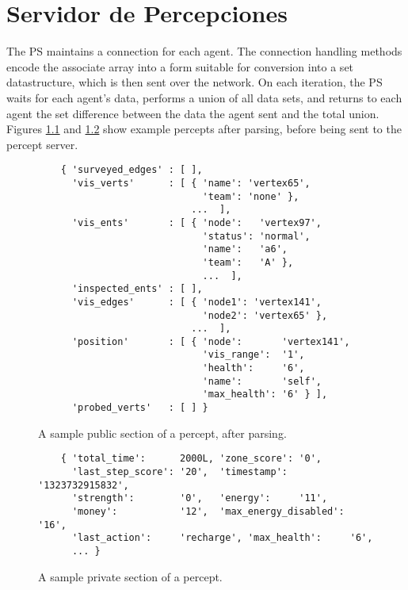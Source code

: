 
\chapter{Servidor de Percepciones}
\label{chap:servidor_de_percepciones}

    The PS maintains a connection for each agent.  The connection handling
    methods encode the associate array into a form suitable for conversion into
    a set datastructure, which is then sent over the network.  On each
    iteration, the PS waits for each agent's data, performs a union of all data
    sets, and returns to each agent the set difference between the data the
    agent sent and the total union.  Figures \ref{fig:pythonperceptpublic} and
    \ref{fig:pythonperceptprivate} show example percepts after parsing, before
    being sent to the percept server.

    \begin{figure}
    \centering
    
    \begin{small}
    \begin{verbatim}
    { 'surveyed_edges' : [ ], 
      'vis_verts'      : [ { 'name': 'vertex65',  
                             'team': 'none' }, 
                           ...  ],  
      'vis_ents'       : [ { 'node':   'vertex97',  
                             'status': 'normal', 
                             'name':   'a6',  
                             'team':   'A' }, 
                             ...  ],  
      'inspected_ents' : [ ],  
      'vis_edges'      : [ { 'node1': 'vertex141', 
                             'node2': 'vertex65' }, 
                           ...  ], 
      'position'       : [ { 'node':       'vertex141', 
                             'vis_range':  '1', 
                             'health':     '6', 
                             'name':       'self', 
                             'max_health': '6' } ], 
      'probed_verts'   : [ ] }
    \end{verbatim}
    \end{small}
    \caption{A sample public section of a percept, after parsing.}
    \label{fig:pythonperceptpublic}
    \end{figure}

    \begin{figure}
   


    \begin{verbatim}
    { 'total_time':      2000L, 'zone_score': '0',            
      'last_step_score': '20',  'timestamp':  '1323732915832',       
      'strength':        '0',   'energy':     '11',                  
      'money':           '12',  'max_energy_disabled': '16',                  
      'last_action':     'recharge', 'max_health':     '6',
      ... }
    \end{verbatim}
    \caption{A sample private section of a percept.}
    \label{fig:pythonperceptprivate}
    \end{figure}

